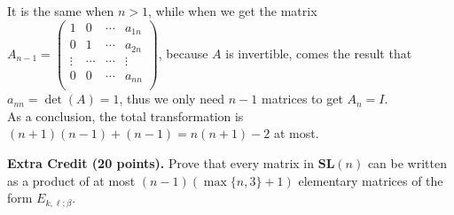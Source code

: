 \documentclass[12pt]{article}
\begin{document}
It is the same when $n > 1$, while when we get the matrix $A_{n-1} = \begin{pmatrix}
1 & 0 & \cdots & a_{1n}\\
0 & 1 & \cdots & a_{2n}\\
\vdots & \cdots & \cdots & \vdots \\
0 & 0 & \cdots & a_{nn}\\
\end{pmatrix}$, because $A$ is invertible, comes the result that $a_{nn} = \det(A) = 1$, thus we only need $n-1$ matrices to get $A_{n} = I$. \\
As a conclusion, the total transformation is $(n+1)(n-1) + (n-1) = n(n+1) - 2$ at most.

\vspace {0.25cm}\noindent
{\bf Extra Credit (20 points).}
Prove that every matrix in $\mathbf{SL}(n)$
can be written as a product of at most
$(n  - 1)(\max\{n, 3\} + 1)$
elementary   matrices of the form  $E_{k,\ell; \beta}$.
\end{document}

